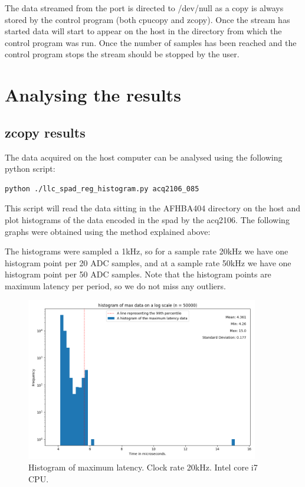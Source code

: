 \documentclass{article}
\begin{document}
The data streamed from the port is directed to /dev/null as a copy is always stored by the control program (both cpucopy and zcopy).
Once the stream has started data will start to appear on the host in the directory from which the control program was run.
Once the number of samples has been reached and the control program stops the stream should be stopped by the user.

\section{Analysing the results} \label{analysis}
\subsection{zcopy results}
The data acquired on the host computer can be analysed using the following python script:

\begin{verbatim}
python ./llc_spad_reg_histogram.py acq2106_085
\end{verbatim}

This script will read the data sitting in the AFHBA404 directory on the host and plot histograms of the data encoded in the spad by the acq2106.
The following graphs were obtained using the method explained above:

The histograms were sampled a 1kHz, so for a sample rate 20kHz we have one histogram point per 20 ADC samples, and at a sample rate 50kHz we have one histogram point per 50 ADC samples.
Note that the histogram points are maximum latency per period, so we do not miss any outliers.

\begin{figure}
	\centering
	\includegraphics[width=4.0in]{images/better_images/20kHz_final_small.png}
	\caption{Histogram of maximum latency. Clock rate 20kHz. Intel core i7 CPU.}
	\label{zcopy20hist}
\end{figure}
\end{document}
